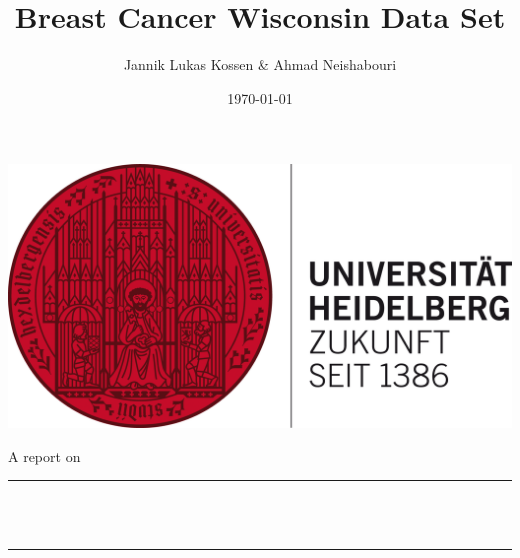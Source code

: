 \documentclass[11pt, a4paper]{scrartcl}
\title{Breast Cancer Wisconsin Data Set} %
\author{Jannik Lukas Kossen \& Ahmad Neishabouri}                               %
\date{\today}                                         %
\makeatletter
\let\thetitle\@title
\makeatother
\begin{document}

\begin{titlepage}
    \centering
    \includegraphics[scale = 0.6]{hdlogo}\\[2.0 cm]  %
     \begin{flushleft}
     \large  \hspace{1cm} A report on 
	\end{flushleft}      
     \centering
    \rule{\linewidth}{0.2 mm} \\[0.4 cm]
    { \huge \bfseries \thetitle}\\
    \rule{\linewidth}{0.2 mm} \\[1.5 cm]
    

\end{titlepage}
\end{document}
